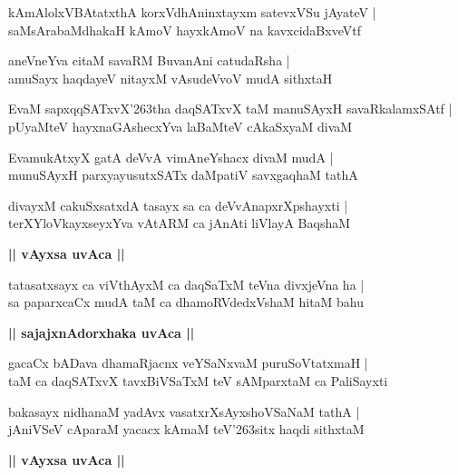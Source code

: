 \documentclass[twoside,12pt,openright]{book}
\def\S{\char'263}
\newcounter{shloka}[chapter]
\def\uvaca#1{\centerline{{\large\textbf{#1}}}}
\begin{document}
\begin{shloka}%
kAmAlolxVBAtatxthA korxVdhAninxtayxm satevxVSu jAyateV |\\
saMsArabaMdhakaH kAmoV hayxkAmoV na kavxcidaBxveVtf
\end{shloka}

\begin{shloka}%
aneVneYva citaM savaRM BuvanAni catudaRsha |\\
amuSayx haqdayeV nitayxM vAsudeVvoV mudA sithxtaH
\end{shloka}

\begin{shloka}%
EvaM sapxqqSATxvX\S tha daqSATxvX taM manuSAyxH savaRkalamxSAtf |\\
pUyaMteV hayxnaGAshecxYva laBaMteV cAkaSxyaM divaM 
\end{shloka}

\begin{shloka}%
EvamukAtxyX gatA deVvA vimAneYshacx divaM mudA |\\
munuSAyxH parxyayusutxSATx daMpatiV savxgaqhaM tathA 
\end{shloka}

\begin{shloka}%
divayxM cakuSxsatxdA tasayx sa ca deVvAnapxrXpshayxti |\\
terXYloVkayxseyxYva vAtARM ca jAnAti liVlayA BaqshaM
\end{shloka}

\uvaca {|| vAyxsa uvAca ||}

\begin{shloka}%
tatasatxsayx ca viVthAyxM ca daqSaTxM teVna divxjeVna ha |\\
sa paparxcaCx mudA taM ca dhamoRVdedxVshaM hitaM bahu
\end{shloka}

\uvaca{|| sajajxnAdorxhaka uvAca ||}

\begin{shloka}%
gacaCx bADava dhamaRjacnx veYSaNxvaM puruSoVtatxmaH |\\
taM ca daqSATxvX tavxBiVSaTxM teV sAMparxtaM ca PaliSayxti
\end{shloka}

\begin{shloka}%
bakasayx nidhanaM yadAvx vasatxrXsAyxshoVSaNaM tathA |\\
jAniVSeV cAparaM yacacx kAmaM teV\S sitx haqdi sithxtaM 
\end{shloka}

\uvaca{|| vAyxsa uvAca ||}
\end{document}
